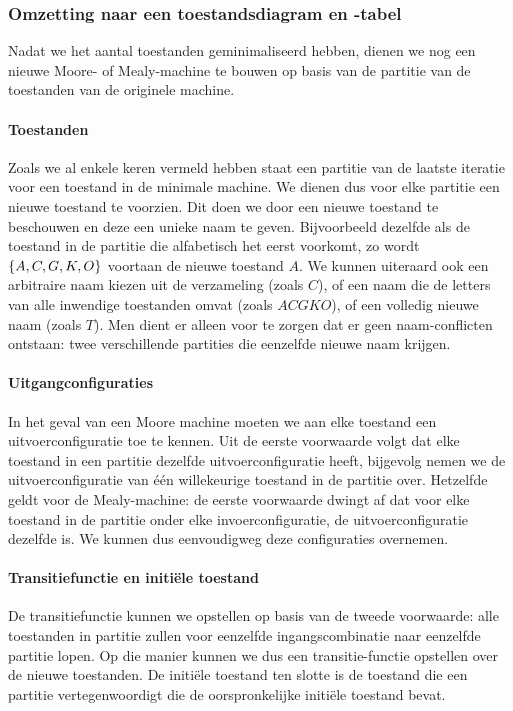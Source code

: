 \subsubsection{Omzetting naar een toestandsdiagram en -tabel}
Nadat we het aantal toestanden geminimaliseerd hebben, dienen we nog een nieuwe Moore- of Mealy-machine te bouwen op basis van de partitie van de toestanden van de originele machine.

\paragraph{Toestanden}
Zoals we al enkele keren vermeld hebben staat een partitie van de laatste iteratie voor een toestand in de minimale machine. We dienen dus voor elke partitie een nieuwe toestand te voorzien. Dit doen we door een nieuwe toestand te beschouwen en deze een unieke naam te geven. Bijvoorbeeld dezelfde als de toestand in de partitie die alfabetisch het eerst voorkomt, zo wordt $\left\{ A,C,G,K,O \right\}$ voortaan de nieuwe toestand $A$. We kunnen uiteraard ook een arbitraire naam kiezen uit de verzameling (zoals $C$), of een naam die de letters van alle inwendige toestanden omvat (zoals $ACGKO$), of een volledig nieuwe naam (zoals $T$). Men dient er alleen voor te zorgen dat er geen naam-conflicten ontstaan: twee verschillende partities die eenzelfde nieuwe naam krijgen.

\paragraph{Uitgangconfiguraties}
In het geval van een Moore machine moeten we aan elke toestand een uitvoerconfiguratie toe te kennen. Uit de eerste voorwaarde volgt dat elke toestand in een partitie dezelfde uitvoerconfiguratie heeft, bijgevolg nemen we de uitvoerconfiguratie van \'e\'en willekeurige toestand in de partitie over. Hetzelfde geldt voor de Mealy-machine: de eerste voorwaarde dwingt af dat voor elke toestand in de partitie onder elke invoerconfiguratie, de uitvoerconfiguratie dezelfde is. We kunnen dus eenvoudigweg deze configuraties overnemen.

\paragraph{Transitiefunctie en initi\"ele toestand}
De transitiefunctie kunnen we opstellen op basis van de tweede voorwaarde: alle toestanden in partitie zullen voor eenzelfde ingangscombinatie naar eenzelfde partitie lopen. Op die manier kunnen we dus een transitie-functie opstellen over de nieuwe toestanden. De initi\"ele toestand ten slotte is de toestand die een partitie vertegenwoordigt die de oorspronkelijke initi\"ele toestand bevat.

